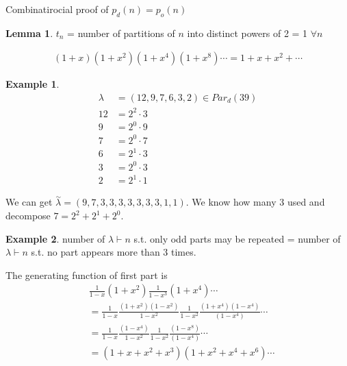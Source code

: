 \documentclass{article}
\theoremstyle{definition}
\newtheorem{ex}{Example}[]
\newtheorem{lm}{Lemma}
\newenvironment{pf*}{\pushQED{\qed}\pf}{\popQED\endpf}
\begin{document}
Combinatirocial proof of $p_d (n) = p_o (n)$
\begin{lm}
    $t_n$ = number of partitions of $n$ into distinct powers of 2 = 1 $\forall n$
\end{lm}
\begin{pf*}
    \begin{align*}
        (1+x) (1+x^2) (1+x^4) (1+x^8) \cdots = 1 + x + x^2 + \cdots 
    \end{align*}
\end{pf*}
\begin{ex}
    \begin{align*}
        \lambda &= ( 12 , 9, 7, 6, 3, 2) \in {Par}_d (39) \\ 
        12 &= 2^2 \cdot 3 \\ 
        9 &= 2^0 \cdot 9 \\ 
        7 &= 2^0 \cdot 7 \\ 
        6 &= 2^1 \cdot 3 \\
        3 &= 2^0 \cdot 3 \\ 
        2 &= 2^1 \cdot 1
    \end{align*}
\end{ex}
We can get $\overset{\sim}{\lambda} = ( 9, 7, 3, 3, 3, 3, 3, 3, 3, 1, 1)$. 
We know how many 3 used and decompose $7 = 2^2 + 2^1 + 2^0$. 
\begin{ex}
    number of $\lambda \vdash n$ s.t. only odd parts may be repeated 
    = number of $\lambda \vdash n$ s.t. no part appears more than 3 times.
\end{ex}
The generating function of first part is 
\begin{align*}
    &\frac{1}{1-x} (1+x^2) \frac{1}{1-x^3} (1+x^4) \cdots  \\ 
    &= \frac{1}{1-x} \frac{(1+x^2)(1-x^2)}{1-x^2} \frac{1}{1-x^2} 
    \frac{(1+x^4)(1-x^4)}{(1-x^4)} \cdots \\
    &= \frac{1}{1-x} \frac{(1-x^4)}{1-x^2} \frac{1}{1-x^2} 
    \frac{(1-x^8)}{(1-x^4)} \cdots \\ 
    &= (1+x + x^2 + x^3)(1+ x^2 +x^4 +x^6) \cdots 
\end{align*}
\end{document}
